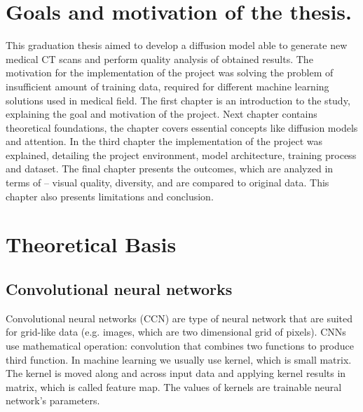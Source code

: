 \documentclass[11pt,a4paper]{report}
\begin{document}
\thispagestyle{empty}

\newpage

\tableofcontents
\chapter{Goals and motivation of the thesis.}
This graduation thesis aimed to develop a diffusion model able to generate new medical CT scans and perform quality analysis of obtained results. The motivation for the implementation of the project was solving the problem of insufficient amount of training data, required for different machine learning solutions used in medical field. 
The first chapter is an introduction to the study, explaining the goal and motivation of the project. 
Next chapter contains theoretical foundations, the chapter covers essential concepts like diffusion models and attention. 
In the third chapter the implementation of the project was explained, detailing the project environment, model architecture, training process and dataset.
The final chapter presents the outcomes, which are analyzed in terms of – visual quality, diversity, and are compared to original data. This chapter also presents limitations and conclusion.

\chapter{Theoretical Basis}

\section{Convolutional neural networks}
Convolutional neural networks (CCN) are type of neural network that are suited for grid-like data (e.g. images, which are two dimensional grid of pixels). CNNs use mathematical operation: convolution that combines two functions to produce third function. In machine learning we usually use kernel, which is small matrix. The kernel is moved along and across input data and applying kernel results in matrix, which is called feature map. The values of kernels are trainable neural network's parameters.
\cite{convolution} \cite{Michal}
\end{document}
